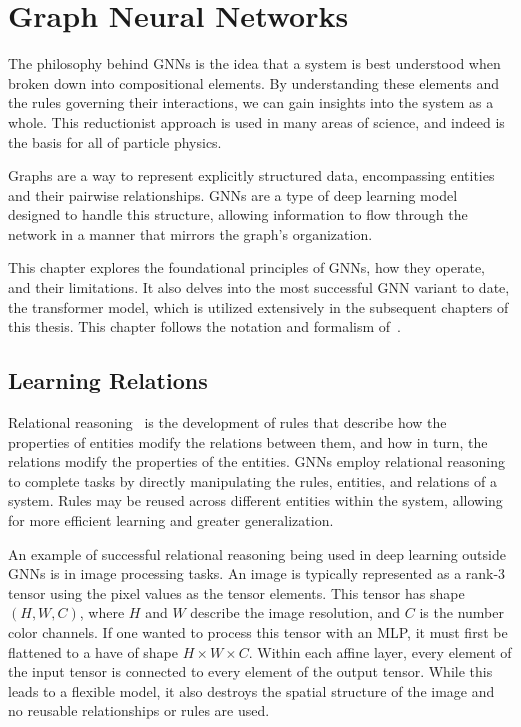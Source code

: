 \chapter{Graph Neural Networks}
\label{ch:gnns}

The philosophy behind \Glspl{GNN} is the idea that a system is best understood when broken down into compositional elements.
By understanding these elements and the rules governing their interactions, we can gain insights into the system as a whole.
This reductionist approach is used in many areas of science, and indeed is the basis for all of particle physics.

Graphs are a way to represent explicitly structured data, encompassing entities and their pairwise relationships.
\Glspl{GNN} are a type of deep learning model designed to handle this structure, allowing information to flow through the network in a manner that mirrors the graph's organization.

This chapter explores the foundational principles of \Glspl{GNN}, how they operate, and their limitations.
It also delves into the most successful \Gls{GNN} variant to date, the transformer model, which is utilized extensively in the subsequent chapters of this thesis.
This chapter follows the notation and formalism of~\textcite{RelationalInductiveBiases}.

\section{Learning Relations}

Relational reasoning~\cite{SimpleNeuralNetwork} is the development of rules that describe how the properties of entities modify the relations between them, and how in turn, the relations modify the properties of the entities.
\Glspl{GNN} employ relational reasoning to complete tasks by directly manipulating the rules, entities, and relations of a system.
Rules may be reused across different entities within the system, allowing for more efficient learning and greater generalization.

An example of successful relational reasoning being used in deep learning outside \Glspl{GNN} is in image processing tasks.
An image is typically represented as a rank-3 tensor using the pixel values as the tensor elements.
This tensor has shape $(H, W, C)$, where $H$ and $W$ describe the image resolution, and $C$ is the number color channels.
If one wanted to process this tensor with an \Gls{MLP}, it must first be flattened to a have of shape $H \times W \times C$.
Within each affine layer, every element of the input tensor is connected to every element of the output tensor.
While this leads to a flexible model, it also destroys the spatial structure of the image and no reusable relationships or rules are used.

